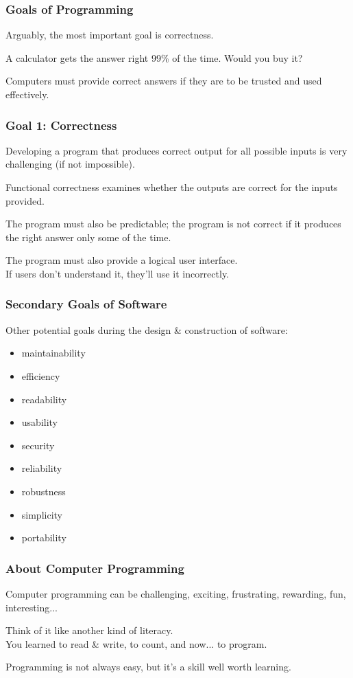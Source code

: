 \begin{frame}
\frametitle{Goals of Programming}
Arguably, the most important goal is correctness.

A calculator gets the answer right 99\% of the time. Would you buy it?

Computers must provide correct answers if they are to be trusted and used effectively.

\end{frame}

\begin{frame}
\frametitle{Goal 1: Correctness}
Developing a program that produces correct output for all possible inputs is very challenging (if not impossible).

\alert{Functional correctness} examines whether the outputs are correct for the inputs provided.

The program must also be predictable; the program is not correct if it produces the right answer only some of the time.

The program must also provide a logical user interface.\\
\quad\quad  If users don't understand it, they'll use it incorrectly.

\end{frame}

\begin{frame}
\frametitle{Secondary Goals of Software}
Other potential goals during the design \& construction of software:

\begin{itemize}
	\item maintainability
	\item efficiency
	\item readability
	\item usability
	\item security
	\item reliability
	\item robustness
	\item simplicity
	\item portability
\end{itemize}

\end{frame}

\begin{frame}
\frametitle{About Computer Programming}
Computer programming can be challenging, exciting, frustrating, rewarding, fun, interesting...

Think of it like another kind of literacy. \\
\quad You learned to read \& write, to count, and now... to program.

Programming is not always easy, but it's a skill well worth learning.

\end{frame}



